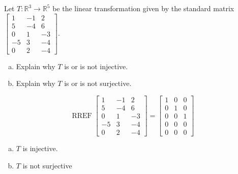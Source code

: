 
\begin{exerciseStatement}
 Let \(T:\mathbb{R}^ 3  \to \mathbb{R}^ 5 \) be the linear transformation given by the standard matrix \( \left[\begin{array}{ccc}
1 & -1 & 2 \\
5 & -4 & 6 \\
0 & 1 & -3 \\
-5 & 3 & -4 \\
0 & 2 & -4
\end{array}\right] .\)
\begin{enumerate}[(a)]
\item Explain why \(T\) is or is not injective.
\item Explain why \(T\) is or is not surjective.
\end{enumerate}
    
\end{exerciseStatement}
    
\begin{exerciseAnswer} 


\[\operatorname{RREF} \left[\begin{array}{ccc}
1 & -1 & 2 \\
5 & -4 & 6 \\
0 & 1 & -3 \\
-5 & 3 & -4 \\
0 & 2 & -4
\end{array}\right] = \left[\begin{array}{ccc}
1 & 0 & 0 \\
0 & 1 & 0 \\
0 & 0 & 1 \\
0 & 0 & 0 \\
0 & 0 & 0
\end{array}\right] \]


\begin{enumerate}[(a)]
\item \(T\) is injective.
\item \(T\) is not surjective
\end{enumerate}
    
\end{exerciseAnswer}
    
